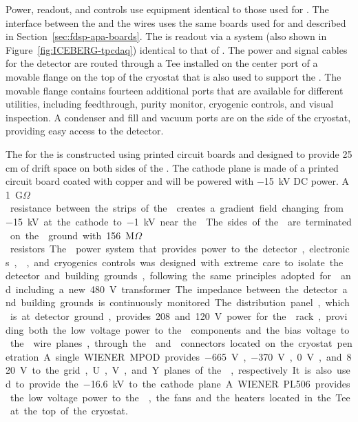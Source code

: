 Power, readout, and controls use equipment identical to those used for . The
interface between the  and the  wires uses the same  boards
used for  and described in Section~\ref{sec:fdsp-apa-boards}. The  is
readout via a  system (also shown in Figure~\ref{fig:ICEBERG-tpcdaq})
identical to that of . The power and signal cables for the detector 
are routed through a Tee installed on the center port of a movable flange on the 
top of the cryostat that is also used to support the . The movable 
flange contains fourteen additional ports that are available for different utilities, 
including  feedthrough, purity monitor, cryogenic controls, and visual inspection. 
A condenser and  fill and vacuum ports are on the side of the cryostat, 
providing easy access to the detector.

The  for the  is constructed using printed circuit boards and 
designed to provide 25 cm of drift space on both sides of the . The cathode 
plane is made of a printed circuit board coated with copper and will be powered with 
\SI{-15}{kV} DC power. A \SI{1}{G$\Omega$} resistance between the strips of the 
creates a gradient field changing from \SI{-15}{kV} at the cathode to \SI{-1}{kV} near the 
. The sides of the  are terminated on the 
ground with \SI{156}{M$\Omega$} resistors. 

The  power system that provides power to the detector, electronics, 
, and cryogenics controls was designed with extreme care to 
isolate the detector and building grounds, following the same principles adopted
for  and including a new \SI{480}{V} transformer. The impedance between the detector
and building grounds is continuously monitored. The distribution panel, which is 
at detector ground, provides 208 and \SI{120}{V} power for the  rack, 
providing both the low voltage power to the  components and the bias 
voltage to the  wire planes, through the  and 
connectors located on the cryostat penetration. A single WIENER MPOD provides 
\SI{-665}{V}, \SI{-370}{V}, \SI{0}{V}, and \SI{820}{V} to the grid, U, V, and 
Y planes of the , respectively. It is also used to provide the 
\SI{-16.6}{kV} to the cathode plane. A WIENER PL506 provides the low voltage
power to the , the fans and the heaters located in the 
Tee at the top of the cryostat. 

